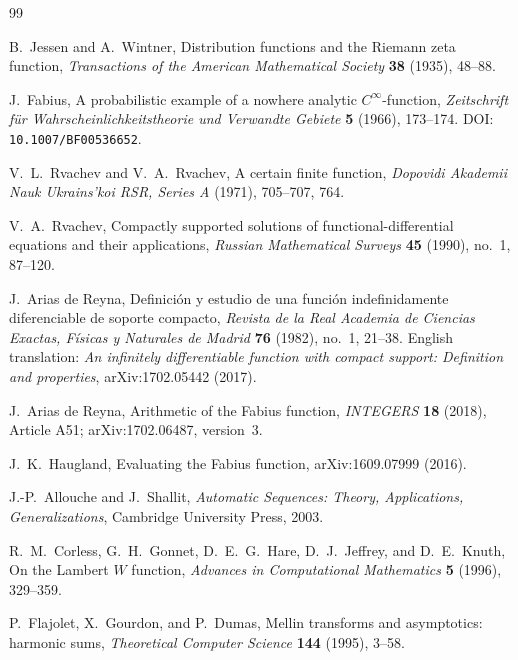 \documentclass[11pt,oneside]{article}
\theoremstyle{definition}
\theoremstyle{remark}
\begin{document}
\begin{thebibliography}{99}

B.~Jessen and A.~Wintner,
\newblock Distribution functions and the Riemann zeta function,
\newblock \emph{Transactions of the American Mathematical Society}
\textbf{38} (1935), 48--88.

J.~Fabius,
\newblock A probabilistic example of a nowhere analytic $C^\infty$-function,
\newblock \emph{Zeitschrift f\"ur Wahrscheinlichkeitstheorie und Verwandte Gebiete}
\textbf{5} (1966), 173--174.
\newblock DOI: \nolinkurl{10.1007/BF00536652}.

V.~L.~Rvachev and V.~A.~Rvachev,
\newblock A certain finite function,
\newblock \emph{Dopovidi Akademii Nauk Ukrains'koi RSR, Series A}
(1971), 705--707, 764.

V.~A.~Rvachev,
\newblock Compactly supported solutions of functional-differential equations and their
applications,
\newblock \emph{Russian Mathematical Surveys} \textbf{45} (1990), no.~1, 87--120.

J.~Arias de Reyna,
\newblock Definici\'on y estudio de una funci\'on indefinidamente diferenciable de soporte
compacto,
\newblock \emph{Revista de la Real Academia de Ciencias Exactas, F\'isicas y Naturales de
Madrid} \textbf{76} (1982), no.~1, 21--38.
\newblock English translation: \emph{An infinitely differentiable function with compact
support: Definition and properties}, arXiv:1702.05442 (2017).

J.~Arias de Reyna,
\newblock Arithmetic of the Fabius function,
\newblock \emph{INTEGERS} \textbf{18} (2018), Article A51; arXiv:1702.06487, version~3.

J.~K.~Haugland,
\newblock Evaluating the Fabius function,
\newblock arXiv:1609.07999 (2016).

J.-P.~Allouche and J.~Shallit,
\newblock \emph{Automatic Sequences: Theory, Applications, Generalizations},
\newblock Cambridge University Press, 2003.

R.~M.~Corless, G.~H.~Gonnet, D.~E.~G.~Hare, D.~J.~Jeffrey, and D.~E.~Knuth,
\newblock On the Lambert $W$ function,
\newblock \emph{Advances in Computational Mathematics} \textbf{5} (1996), 329--359.

P.~Flajolet, X.~Gourdon, and P.~Dumas,
\newblock Mellin transforms and asymptotics: harmonic sums,
\newblock \emph{Theoretical Computer Science} \textbf{144} (1995), 3--58.


\end{thebibliography}
\end{document}
